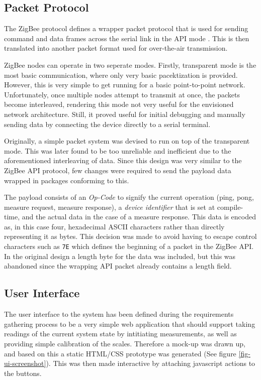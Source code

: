\subsection{Packet Protocol}
The ZigBee protocol defines a wrapper packet protocol that is used for sending command and data frames across the serial link in the API mode \cite[page 35]{zigbee-datasheet}. This is then translated into another packet format used for over-the-air transmission.

ZigBee nodes can operate in two seperate modes. Firstly, transparent mode is the most basic communication, where only very basic pacektization is provided. However, this is very simple to get running for a basic point-to-point network. Unfortunately, once multiple nodes attempt to transmit at once, the packets become interleaved, rendering this mode not very useful for the envisioned network architecture. Still, it proved useful for initial debugging and manually sending data by connecting the device directly to a serial terminal.

Originally, a simple packet system was devised to run on top of the transparent mode. This was later found to be too unreliable and inefficient due to the aforementioned interleaving of data. Since this design was very similar to the ZigBee API protocol, few changes were required to send the payload data wrapped in packages conforming to this.

The payload consists of an \emph{Op-Code} to signify the current operation (ping, pong, measure request, measure response), a \emph{device identifier} that is set at compile-time, and the actual data in the case of a measure response. This data is encoded as, in this case four, hexadecimal ASCII characters rather than directly representing it as bytes. This decision was made to avoid having to escape control characters such as \texttt{7E} which defines the beginning of a packet in the ZigBee API. In the original design a length byte for the data was included, but this was abandoned since the wrapping API packet already contains a length field.

\subsection{User Interface}
The user interface to the system has been defined during the requirements gathering process to be a very simple web application that should support taking readings of the current system state by intitiating measurements, as well as providing simple calibration of the scales. Therefore a mock-up was drawn up, and based on this a static HTML/CSS prototype was generated (See figure \ref{fig-ui-screenshot}). This was then made interactive by attaching javascript actions to the buttons.

